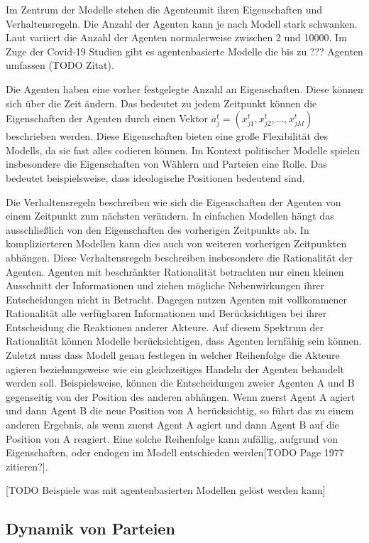 Im Zentrum der Modelle stehen die Agentenmit ihren Eigenschaften und Verhaltensregeln. Die Anzahl der Agenten kann je nach Modell stark schwanken. Laut \cite{marchi2014ABMs} variiert die Anzahl der Agenten normalerweise zwischen 2 und 10000. Im Zuge der Covid-19 Studien gibt es agentenbasierte Modelle die bis zu ??? Agenten umfassen (TODO Zitat).

Die Agenten haben eine vorher festgelegte Anzahl an Eigenschaften. Diese können sich über die Zeit ändern. Das bedeutet zu jedem Zeitpunkt können die Eigenschaften der Agenten durch einen Vektor $a_j^t = (x_{j1}^t, x_{j2}^t,..., x_{jM}^t)$ beschrieben werden. Diese Eigenschaften bieten eine große Flexibilität des Modells, da sie fast alles codieren können. Im Kontext politischer Modelle spielen insbesondere die Eigenschaften von Wählern und Parteien eine Rolle. Das bedeutet beispielsweise, dass ideologische Positionen bedeutend sind.

Die Verhaltensregeln beschreiben wie sich die Eigenschaften der Agenten von einem Zeitpunkt zum nächsten verändern. In einfachen Modellen hängt das ausschließlich von den Eigenschaften des vorherigen Zeitpunkts ab. In komplizierteren Modellen kann dies auch von weiteren vorherigen Zeitpunkten abhängen. Diese Verhaltensregeln beschreiben insbesondere die Rationalität der Agenten. Agenten mit beschränkter Rationalität betrachten nur einen kleinen Ausschnitt der Informationen und ziehen mögliche Nebenwirkungen ihrer Entscheidungen nicht in Betracht. Dagegen nutzen Agenten mit vollkommener Rationalität alle verfügbaren Informationen und Berücksichtigen bei ihrer Entscheidung die Reaktionen anderer Akteure. Auf diesem Spektrum der Rationalität können Modelle berücksichtigen, dass Agenten lernfähig sein können. Zuletzt muss dass Modell genau festlegen in welcher Reihenfolge die Akteure agieren beziehungsweise wie ein gleichzeitiges Handeln der Agenten behandelt werden soll. Beispielsweise, können die Entscheidungen zweier Agenten A und B gegenseitig von der Position des anderen abhängen. Wenn zuerst Agent A agiert und dann Agent B die neue Position von A berücksichtig, so führt das zu einem anderen Ergebnis, als wenn zuerst Agent A agiert und dann Agent B auf die Position von A reagiert. Eine solche Reihenfolge kann zufällig, aufgrund von Eigenschaften, oder endogen im Modell entschieden werden[TODO Page 1977 zitieren?].

[TODO Beispiele was mit agentenbasierten Modellen gelöst werden kann]

\subsection{Dynamik von Parteien} \label{sec:ABM-Dynamik}

